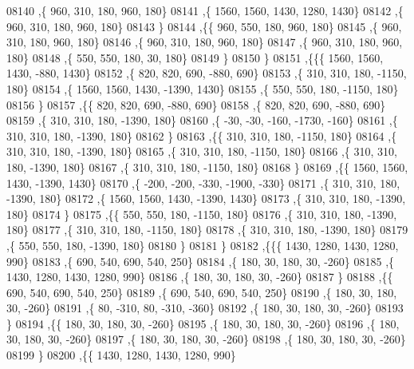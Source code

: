 \begin{DoxyCode}
08140     ,\{   960,   310,   180,   960,   180\}
08141     ,\{  1560,  1560,  1430,  1280,  1430\}
08142     ,\{   960,   310,   180,   960,   180\}
08143     \}
08144    ,\{\{   960,   550,   180,   960,   180\}
08145     ,\{   960,   310,   180,   960,   180\}
08146     ,\{   960,   310,   180,   960,   180\}
08147     ,\{   960,   310,   180,   960,   180\}
08148     ,\{   550,   550,   180,    30,   180\}
08149     \}
08150    \}
08151   ,\{\{\{  1560,  1560,  1430,  -880,  1430\}
08152     ,\{   820,   820,   690,  -880,   690\}
08153     ,\{   310,   310,   180, -1150,   180\}
08154     ,\{  1560,  1560,  1430, -1390,  1430\}
08155     ,\{   550,   550,   180, -1150,   180\}
08156     \}
08157    ,\{\{   820,   820,   690,  -880,   690\}
08158     ,\{   820,   820,   690,  -880,   690\}
08159     ,\{   310,   310,   180, -1390,   180\}
08160     ,\{   -30,   -30,  -160, -1730,  -160\}
08161     ,\{   310,   310,   180, -1390,   180\}
08162     \}
08163    ,\{\{   310,   310,   180, -1150,   180\}
08164     ,\{   310,   310,   180, -1390,   180\}
08165     ,\{   310,   310,   180, -1150,   180\}
08166     ,\{   310,   310,   180, -1390,   180\}
08167     ,\{   310,   310,   180, -1150,   180\}
08168     \}
08169    ,\{\{  1560,  1560,  1430, -1390,  1430\}
08170     ,\{  -200,  -200,  -330, -1900,  -330\}
08171     ,\{   310,   310,   180, -1390,   180\}
08172     ,\{  1560,  1560,  1430, -1390,  1430\}
08173     ,\{   310,   310,   180, -1390,   180\}
08174     \}
08175    ,\{\{   550,   550,   180, -1150,   180\}
08176     ,\{   310,   310,   180, -1390,   180\}
08177     ,\{   310,   310,   180, -1150,   180\}
08178     ,\{   310,   310,   180, -1390,   180\}
08179     ,\{   550,   550,   180, -1390,   180\}
08180     \}
08181    \}
08182   ,\{\{\{  1430,  1280,  1430,  1280,   990\}
08183     ,\{   690,   540,   690,   540,   250\}
08184     ,\{   180,    30,   180,    30,  -260\}
08185     ,\{  1430,  1280,  1430,  1280,   990\}
08186     ,\{   180,    30,   180,    30,  -260\}
08187     \}
08188    ,\{\{   690,   540,   690,   540,   250\}
08189     ,\{   690,   540,   690,   540,   250\}
08190     ,\{   180,    30,   180,    30,  -260\}
08191     ,\{    80,  -310,    80,  -310,  -360\}
08192     ,\{   180,    30,   180,    30,  -260\}
08193     \}
08194    ,\{\{   180,    30,   180,    30,  -260\}
08195     ,\{   180,    30,   180,    30,  -260\}
08196     ,\{   180,    30,   180,    30,  -260\}
08197     ,\{   180,    30,   180,    30,  -260\}
08198     ,\{   180,    30,   180,    30,  -260\}
08199     \}
08200    ,\{\{  1430,  1280,  1430,  1280,   990\}

\end{DoxyCode}
